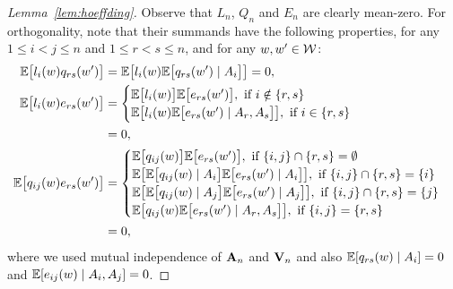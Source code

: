 \begin{proof}[Lemma~\ref{lem:hoeffding}]
  Observe that
  $L_n$, $Q_n$ and $E_n$
  are clearly mean-zero.
  For orthogonality,
  note that their summands
  have the following properties,
  for any $1 \leq i < j \leq n$
  and $1 \leq r < s \leq n$,
  and for any $w, w' \in \mathcal{W}$:
  \begin{align*}
    \mathbb{E}\big[
      l_i(w)
      q_{rs}(w')
    \big]
    &=
    \mathbb{E}\big[
      l_i(w)
      \mathbb{E}\big[
        q_{rs}(w') \mid A_i
      \big]
    \big]
    = 0, \\
    \mathbb{E}\big[
      l_i(w)
      e_{rs}(w')
    \big]
    &=
    \begin{cases}
      \mathbb{E}\big[
        l_i(w)
      \big]
      \mathbb{E}\big[
        e_{rs}(w')
      \big],
      \text{ if } i \notin \{r,s\} \\
      \mathbb{E}\big[
        l_i(w)
        \mathbb{E}\big[
          e_{rs}(w') \mid A_r, A_s
        \big]
      \big],
      \text{ if } i \in \{r,s\}
    \end{cases} \\
    &=
    0, \\
    \mathbb{E}\big[
      q_{i j}(w)
      e_{rs}(w')
    \big]
    &=
    \begin{cases}
      \mathbb{E}\big[
        q_{i j}(w)
      \big]
      \mathbb{E}\big[
        e_{rs}(w')
      \big],
      \text{ if } \{i,j\} \cap \{r,s\} = \emptyset \\
      \mathbb{E}\big[
        \mathbb{E}\big[
          q_{i j}(w) \mid A_i
        \big]
        \mathbb{E}\big[
          e_{rs}(w') \mid A_i
        \big]
      \big],
      \text{ if } \{i,j\} \cap \{r,s\} = \{i\}     \\
      \mathbb{E}\big[
        \mathbb{E}\big[
          q_{i j}(w) \mid A_j
        \big]
        \mathbb{E}\big[
          e_{rs}(w') \mid A_j
        \big]
      \big],
      \text{ if } \{i,j\} \cap \{r,s\} = \{j\}     \\
      \mathbb{E}\big[
        q_{i j}(w)
        \mathbb{E}\big[
          e_{rs}(w') \mid A_r, A_s
        \big]
      \big],
      \text{ if } \{i,j\} = \{r,s\}
    \end{cases} \\
    &=
    0,
  \end{align*}
  where we used mutual independence of
  $\mathbf{A}_n$ and $\mathbf{V}_n$
  and also
  $\mathbb{E}[q_{rs}(w) \mid A_i] = 0$
  and
  $\mathbb{E}[e_{i j}(w) \mid A_i, A_j] = 0$.
\end{proof}

